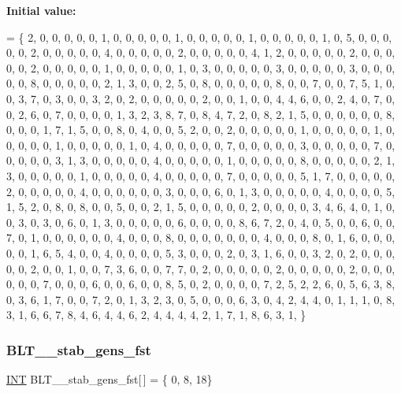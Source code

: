 {\bfseries Initial value\+:}
\begin{DoxyCode}
= \{
2, 0, 0, 0, 0, 0, 1, 0, 0, 0, 0, 0, 1, 0, 0, 0, 0, 0, 1, 0, 0, 0, 0, 0, 1, 0, 
5, 0, 0, 0, 0, 0, 2, 0, 0, 0, 0, 0, 4, 0, 0, 0, 0, 0, 2, 0, 0, 0, 0, 0, 4, 1, 
2, 0, 0, 0, 0, 0, 2, 0, 0, 0, 0, 0, 2, 0, 0, 0, 0, 0, 1, 0, 0, 0, 0, 0, 1, 0, 
3, 0, 0, 0, 0, 0, 3, 0, 0, 0, 0, 0, 3, 0, 0, 0, 0, 0, 8, 0, 0, 0, 0, 0, 2, 1, 
3, 0, 0, 2, 5, 0, 8, 0, 0, 0, 0, 0, 8, 0, 0, 7, 0, 0, 7, 5, 1, 0, 0, 3, 7, 0, 
3, 0, 0, 3, 2, 0, 2, 0, 0, 0, 0, 0, 2, 0, 0, 1, 0, 0, 4, 4, 6, 0, 0, 2, 4, 0, 
7, 0, 0, 2, 6, 0, 7, 0, 0, 0, 0, 1, 3, 2, 3, 8, 7, 0, 8, 4, 7, 2, 0, 8, 2, 1, 
5, 0, 0, 0, 0, 0, 0, 8, 0, 0, 0, 1, 7, 1, 5, 0, 0, 8, 0, 4, 0, 0, 5, 2, 0, 0, 
2, 0, 0, 0, 0, 0, 1, 0, 0, 0, 0, 0, 1, 0, 0, 0, 0, 0, 1, 0, 0, 0, 0, 0, 1, 0, 
4, 0, 0, 0, 0, 0, 7, 0, 0, 0, 0, 0, 3, 0, 0, 0, 0, 0, 7, 0, 0, 0, 0, 0, 3, 1, 
3, 0, 0, 0, 0, 0, 4, 0, 0, 0, 0, 0, 1, 0, 0, 0, 0, 0, 8, 0, 0, 0, 0, 0, 2, 1, 
3, 0, 0, 0, 0, 0, 1, 0, 0, 0, 0, 0, 4, 0, 0, 0, 0, 0, 7, 0, 0, 0, 0, 0, 5, 1, 
7, 0, 0, 0, 0, 0, 2, 0, 0, 0, 0, 0, 4, 0, 0, 0, 0, 0, 0, 3, 0, 0, 0, 6, 0, 1, 
3, 0, 0, 0, 0, 0, 4, 0, 0, 0, 0, 5, 1, 5, 2, 0, 8, 0, 8, 0, 0, 5, 0, 0, 2, 1, 
5, 0, 0, 0, 0, 0, 2, 0, 0, 0, 0, 3, 4, 6, 4, 0, 1, 0, 0, 3, 0, 3, 0, 6, 0, 1, 
3, 0, 0, 0, 0, 0, 6, 0, 0, 0, 0, 8, 6, 7, 2, 0, 4, 0, 5, 0, 0, 6, 0, 0, 7, 0, 
1, 0, 0, 0, 0, 0, 0, 4, 0, 0, 0, 8, 0, 0, 0, 0, 0, 0, 0, 4, 0, 0, 0, 8, 0, 1, 
6, 0, 0, 0, 0, 0, 1, 6, 5, 4, 0, 0, 4, 0, 0, 0, 0, 5, 3, 0, 0, 0, 2, 0, 3, 1, 
6, 0, 0, 3, 2, 0, 2, 0, 0, 0, 0, 0, 2, 0, 0, 1, 0, 0, 7, 3, 6, 0, 0, 7, 7, 0, 
2, 0, 0, 0, 0, 0, 2, 0, 0, 0, 0, 0, 2, 0, 0, 0, 0, 0, 0, 7, 0, 0, 0, 6, 0, 0, 
6, 0, 0, 8, 5, 0, 2, 0, 0, 0, 0, 7, 2, 5, 2, 2, 6, 0, 5, 6, 3, 8, 0, 3, 6, 1, 
7, 0, 0, 7, 2, 0, 1, 3, 2, 3, 0, 5, 0, 0, 0, 6, 3, 0, 4, 2, 4, 4, 0, 1, 1, 1, 
0, 8, 3, 1, 6, 6, 7, 8, 4, 6, 4, 4, 6, 2, 4, 4, 4, 4, 2, 1, 7, 1, 8, 6, 3, 1, 
\}
\end{DoxyCode}
\mbox{\label{data___b_l_t_8_c_afa8a33351abec7e9c6e541fddf23683f}} 
\subsubsection{\texorpdfstring{B\+L\+T\+\_\+\_\+stab\+\_\+gens\+\_\+fst}{BLT\_9\_stab\_gens\_fst}}
{\footnotesize\ttfamily \mbox{\hyperlink{galois_8h_a09fddde158a3a20bd2dcadb609de11dc}{I\+NT}} B\+L\+T\+\_\+\_\+stab\+\_\+gens\+\_\+fst\mbox{[}$\,$\mbox{]} = \{ 0, 8, 18\}}


